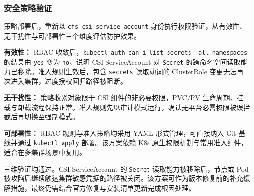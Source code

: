 \subsubsection{安全策略验证}

策略部署后，重新以 \texttt{cfs-csi-service-account} 身份执行权限验证，从有效性、无干扰性与可部署性三个维度评估防护效果。

\textbf{有效性：}
RBAC 收敛后，\texttt{kubectl auth can-i list secrets --all-namespaces} 的结果由 \texttt{yes} 变为 \texttt{no}，说明 CSI ServiceAccount 对 \texttt{Secret} 的跨命名空间读取能力已移除。准入规则生效后，包含 \texttt{secrets} 读取动词的 ClusterRole 变更无法再次进入集群，过度授权回归路径被阻断。

\textbf{无干扰性：}
策略收紧对象限于 CSI 组件的非必要权限，PVC/PV 生命周期、挂载与卸载流程保持正常。准入规则先以审计模式运行，确认无平台必需权限被误拦截后再切换至强制模式。

\textbf{可部署性：}
RBAC 规则与准入策略均采用 YAML 形式管理，可直接纳入 Git 基线并通过 \texttt{kubectl apply} 部署。该方案依赖 K8s 原生权限机制与常用准入组件，适合在多集群场景中复用。

三维验证均通过。CSI ServiceAccount 的 \texttt{Secret} 读取能力被移除后，节点或 Pod 被攻陷后继续触达集群敏感凭据的路径被关闭。该方案可作为版本修复前的补充缓解措施，最终仍需结合官方修复与安装清单更新完成根因处理。



